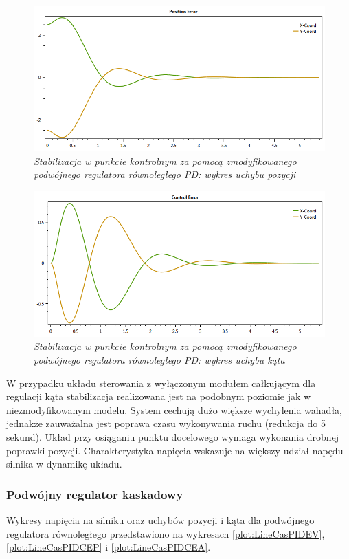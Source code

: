 \documentclass[12pt, oneside]{report}
\theoremstyle{definition}
\begin{document}
\begin{figure}[H]
	\centering
		\includegraphics[width = 350pt]{LinePDCEP} 
		\caption{\textit{Stabilizacja w punkcie kontrolnym za pomocą zmodyfikowanego podwójnego regulatora równoległego PD: wykres uchybu pozycji}}
		\label{plot:LinePDCEP}
\end{figure}

\begin{figure}[H]
	\centering
		\includegraphics[width = 350pt]{LinePDCEA} 
		\caption{\textit{Stabilizacja w punkcie kontrolnym za pomocą zmodyfikowanego podwójnego regulatora równoległego PD: wykres uchybu kąta}}
		\label{plot:LinePDCEA}
\end{figure}

W przypadku układu sterowania z wyłączonym modułem całkującym dla regulacji kąta stabilizacja realizowana jest na podobnym poziomie jak w niezmodyfikowanym modelu. System cechują dużo większe wychylenia wahadła, jednakże zauważalna jest poprawa czasu wykonywania ruchu (redukcja do 5 sekund). Układ przy osiąganiu punktu docelowego wymaga wykonania drobnej poprawki pozycji. Charakterystyka napięcia wskazuje na większy udział napędu silnika w dynamikę układu. 

\subsubsection{Podwójny regulator kaskadowy}
Wykresy napięcia na silniku oraz uchybów pozycji i kąta dla podwójnego regulatora równoległego przedstawiono na wykresach \ref{plot:LineCasPIDEV}, \ref{plot:LineCasPIDCEP} i \ref{plot:LineCasPIDCEA}.
\end{document}
